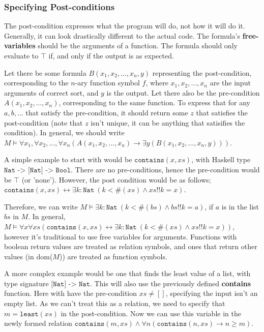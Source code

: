 \documentclass[a4paper, 12pt]{article}
\begin{document}
            \subsubsection*{Specifying Post-conditions}
                The post-condition expresses what the program will do, not how it will do it. Generally, it can look drastically different to the actual code. The formula's \textbf{free-variables} should be the arguments of a function. The formula should only evaluate to $\top$ if, and only if the output is as expected.
                \medskip

                Let there be some formula $B(x_1, x_2, ..., x_n, y)$ representing the post-condition, corresponding to the $n$-ary function symbol $f$, where $x_1, x_2, ..., x_n$ are the input arguments of correct sort, and $y$ is the output. Let there also be the pre-condition $A(x_1, x_2, ..., x_n)$, corresponding to the same function. To express that for any $a, b, ...$ that satisfy the pre-condition, it should return some $z$ that satisfies the post-condition (note that $z$ isn't unique, it can be anything that satisifies the condition). In general, we should write $M \vDash \forall x_1, \forall x_2, ..., \forall x_n (A(x_1, x_2, ..., x_n) \rightarrow \exists y (B(x_1, x_2, ..., x_n, y)))$.
                \medskip

                A simple example to start with would be $\texttt{contains}(x, xs)$, with Haskell type $\texttt{Nat -> [Nat] -> Bool}$. There are no pre-conditions, hence the pre-condition would be $\top$ (or 'none'). However, the post condition would be as follows; $\texttt{contains}(x, xs) \leftrightarrow \exists k : \texttt{Nat}\ (k < \#(xs) \land xs !! k = x)$.
                \smallskip

                Therefore, we can write $M \vDash \exists k : \texttt{Nat}\ (k < \#(bs) \land bs !! k = a)$, if $a$ is in the list $bs$ in $M$. In general, $M \vDash \forall x \forall xs (\texttt{contains}(x, xs) \leftrightarrow \exists k : \texttt{Nat}\ (k < \#(xs) \land xs !! k = x))$, however it's traditional to use free variables for arguments. Functions with boolean return values are treated as relation symbols, and ones that return other values (in dom($M$)) are treated as function symbols.
                \medskip

                A more complex example would be one that finds the least value of a list, with type signature $\texttt{[Nat] -> Nat}$. This will also use the previously defined \textbf{contains} function. Here with have the pre-condition $xs \neq []$, specifying the input isn't an empty list. As we can't treat this as a relation, we need to specify that $m = \texttt{least}(xs)$ in the post-condition. Now we can use this variable in the newly formed relation $\texttt{contains}(m, xs) \land \forall n (\texttt{contains}(n, xs) \rightarrow n \geq m)$.
                \medskip
\end{document}
